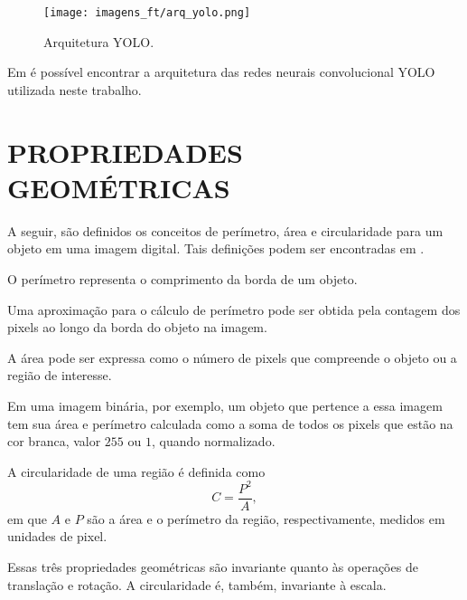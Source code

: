 \begin{figure}[H]
	\centering
	\texttt{[image: imagens\_ft/arq\_yolo.png]}
	\caption{Arquitetura YOLO. \cite{yolo1}}
	\label{fig:arquitetura_YOLO}
\end{figure}

Em \cite{yolo1} é possível encontrar a arquitetura das redes neurais convolucional YOLO utilizada neste trabalho.

\section{PROPRIEDADES GEOMÉTRICAS}

A seguir, são definidos os conceitos de perímetro, área e circularidade para um objeto em uma imagem digital. Tais definições podem ser encontradas em \cite{pedrinischwartz}.

\begin{define}
	O perímetro representa o comprimento da borda de um objeto.
	\label{def:perimetro}
\end{define}

Uma aproximação para o cálculo de perímetro pode ser obtida pela contagem dos pixels ao longo da borda do objeto na imagem. 

\begin{define}
	A área pode ser expressa como o número de pixels que compreende o objeto ou a região de interesse.
	\label{def:area}
\end{define}

Em uma imagem binária, por exemplo, um objeto que pertence a essa imagem tem sua área e perímetro calculada como a soma de todos os pixels que estão na cor branca, valor $255$ ou $1$, quando normalizado.

\begin{define}
	A circularidade de uma região é definida como
	\begin{equation}
		C = \frac{P^2}{A},
		\label{eq:circularidade}
	\end{equation}
	em que $A$ e $P$ são a área e o perímetro da região, respectivamente, medidos em unidades de pixel.
\end{define}

Essas três propriedades geométricas são invariante quanto às operações de translação e rotação. A circularidade é, também, invariante à escala.

